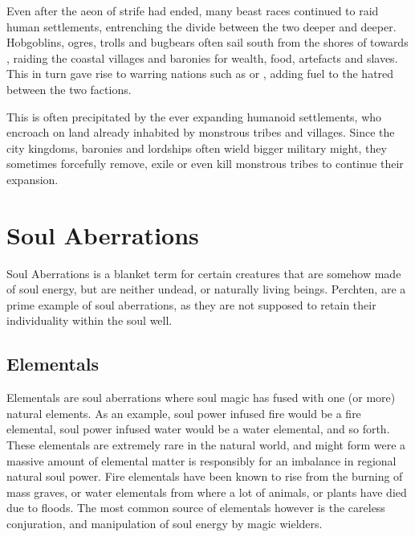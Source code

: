 Even after the aeon of strife had ended, many beast races continued to raid
human settlements, entrenching the divide between the two deeper and deeper.
Hobgoblins, ogres, trolls and bugbears often sail south from the shores of
 towards , raiding the coastal
villages and baronies for wealth, food, artefacts and slaves. This in turn
gave rise to warring nations such as  or
, adding fuel to the hatred between the two factions.

This is often precipitated by the ever expanding humanoid settlements, who
encroach on land already inhabited by monstrous tribes and villages. Since the
city kingdoms, baronies and lordships often wield bigger military might, they
sometimes forcefully remove, exile or even kill monstrous tribes to continue
their expansion.











\section{Soul Aberrations}
\label{sec:Soul Aberrations}

Soul Aberrations is a blanket term for certain creatures that are somehow made
of soul energy, but are neither undead, or naturally living beings. Perchten,
are a prime example of soul aberrations, as they are not supposed to retain
their individuality within the soul well.

\subsection{Elementals}
\label{sec:Elementals}

Elementals are soul aberrations where soul magic has fused with one (or more)
natural elements. As an example, soul power infused fire would be a fire
elemental, soul power infused water would be a water elemental, and so forth.
These elementals are extremely rare in the natural world, and might form were
a massive amount of elemental matter is responsibly for an imbalance in
regional natural soul power. Fire elementals have been known to rise from the
burning of mass graves, or water elementals from where a lot of animals, or
plants have died due to floods. The most common source of elementals however
is the careless conjuration, and manipulation of soul energy by magic
wielders.


